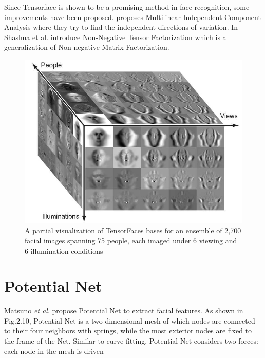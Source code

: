 \documentclass[12pt]{report}
\begin{document}
\par
Since Tensorface is shown to be a promising method in face recognition, some improvements have been proposed. \cite{92} proposes Multilinear Independent Component Analysis where they try to find the independent directions of variation. In \cite{76} Shashua et al. introduce Non-Negative Tensor Factorization which is a generalization of Non-negative Matrix Factorization.
\par 
\begin{figure}
\includegraphics[width=\textwidth]{../img/20_1.png}
\caption{A partial visualization of TensorFaces bases for an ensemble of 2,700 facial images spanning 75 people, each imaged under 6 viewing and 6 illumination conditions \cite{92}}
\label{Fig 2.9}
\end{figure}
\section{Potential Net}
\par 
Matsuno \textit{et al}. \cite{61} \cite{41} propose Potential Net to extract facial features. As shown in Fig.2.10, Potential Net is a two dimensional mesh of which nodes are connected to their four neighbors with springs, while the most exterior nodes are fixed to the frame of the Net. Similar to curve fitting, Potential Net considers two forces: each node in the mesh is driven
\end{document}

